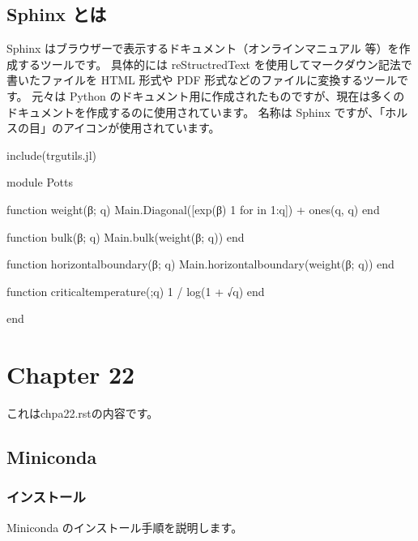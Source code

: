 \documentclass[letterpaper,10pt,dvipdfmx]{sphinxmanual}
\begin{document}
\subsection{Sphinx とは}
\label{\detokenize{chapter2/chap2-1:sphinx}}
\sphinxAtStartPar
Sphinx はブラウザーで表示するドキュメント（オンラインマニュアル 等）を作成するツールです。
具体的には reStructredText を使用してマークダウン記法で書いたファイルを HTML 形式や PDF 形式などのファイルに変換するツールです。
元々は Python のドキュメント用に作成されたものですが、現在は多くのドキュメントを作成するのに使用されています。
名称は Sphinx ですが、「ホルスの目」のアイコンが使用されています。

\begin{sphinxVerbatim}[commandchars=\\\{\}]
include(\PYGZdq{}trgutils.jl\PYGZdq{})

module Potts

function weight(β; q)
  Main.Diagonal([exp(β) \PYGZhy{} 1 for \PYGZus{} in 1:q]) + ones(q, q)
end

function bulk(β; q)
  Main.bulk(weight(β; q))
end

function horizontalboundary(β; q)
  Main.horizontalboundary(weight(β; q))
end

function criticaltemperature(;q)
  1 / log(1 + √q)
end

end
\end{sphinxVerbatim}

\sphinxstepscope


\section{Chapter 2\sphinxhyphen{}2}
\label{\detokenize{chapter2/chap2-2:chapter-2-2}}\label{\detokenize{chapter2/chap2-2::doc}}
\sphinxAtStartPar
これはchpa2\sphinxhyphen{}2.rstの内容です。

\sphinxstepscope


\subsection{Miniconda}
\label{\detokenize{chapter2/uo:miniconda}}\label{\detokenize{chapter2/uo::doc}}

\subsubsection{インストール}
\label{\detokenize{chapter2/uo:id1}}
\sphinxAtStartPar
Miniconda のインストール手順を説明します。
\end{document}

